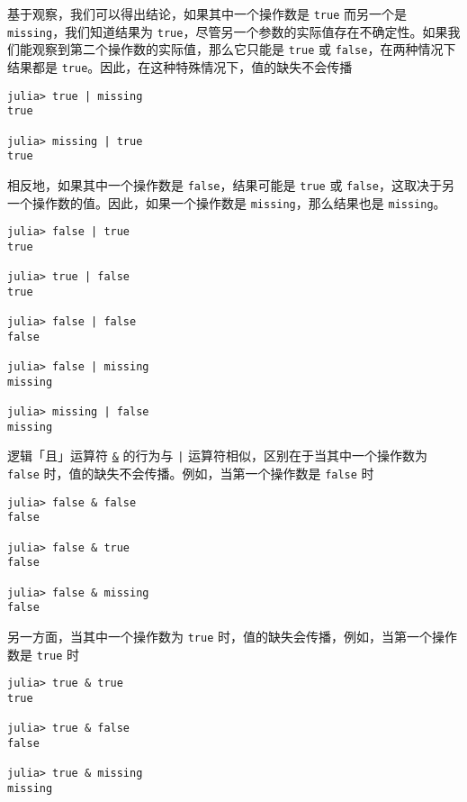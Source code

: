 基于观察，我们可以得出结论，如果其中一个操作数是 \texttt{true} 而另一个是 \texttt{missing}，我们知道结果为 \texttt{true}，尽管另一个参数的实际值存在不确定性。如果我们能观察到第二个操作数的实际值，那么它只能是 \texttt{true} 或 \texttt{false}，在两种情况下结果都是 \texttt{true}。因此，在这种特殊情况下，值的缺失不会传播




\begin{verbatim}
julia> true | missing
true

julia> missing | true
true
\end{verbatim}



相反地，如果其中一个操作数是 \texttt{false}，结果可能是 \texttt{true} 或 \texttt{false}，这取决于另一个操作数的值。因此，如果一个操作数是 \texttt{missing}，那么结果也是 \texttt{missing}。




\begin{verbatim}
julia> false | true
true

julia> true | false
true

julia> false | false
false

julia> false | missing
missing

julia> missing | false
missing
\end{verbatim}



逻辑「且」运算符 \hyperlink{1494761116451616317}{\texttt{\&}} 的行为与 \texttt{|} 运算符相似，区别在于当其中一个操作数为 \texttt{false} 时，值的缺失不会传播。例如，当第一个操作数是 \texttt{false} 时




\begin{verbatim}
julia> false & false
false

julia> false & true
false

julia> false & missing
false
\end{verbatim}



另一方面，当其中一个操作数为 \texttt{true} 时，值的缺失会传播，例如，当第一个操作数是 \texttt{true} 时




\begin{verbatim}
julia> true & true
true

julia> true & false
false

julia> true & missing
missing
\end{verbatim}



